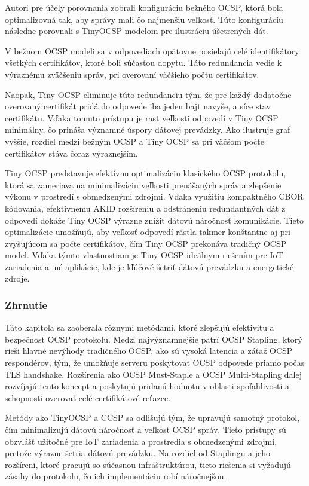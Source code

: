 \documentclass[12pt, twoside]{book}
\begin{document}
Autori pre účely porovnania zobrali konfiguráciu bežného OCSP, ktorá bola optimalizovná tak, aby správy mali čo najmenšiu veľkosť. Túto konfiguráciu následne porovnali s TinyOCSP modelom pre ilustráciu úšetrených dát.

V bežnom OCSP modeli sa v odpovediach opätovne posielajú celé identifikátory všetkých certifikátov, ktoré boli súčasťou dopytu. Táto redundancia vedie k výraznému zväčšeniu správ, pri overovaní väčšieho počtu certifikátov.

Naopak, Tiny OCSP eliminuje túto redundanciu tým, že pre každý dodatočne overovaný certifikát pridá do odpovede iba jeden bajt navyše, a síce stav certifikátu. Vďaka tomuto prístupu je rast veľkosti odpovedí v Tiny OCSP minimálny, čo prináša významné úspory dátovej prevádzky. Ako ilustruje graf vyššie, rozdiel medzi bežným OCSP a Tiny OCSP sa pri väčšom počte certifikátov stáva čoraz výraznejším. 

Tiny OCSP predstavuje efektívnu optimalizáciu klasického OCSP protokolu, ktorá sa zameriava na minimalizáciu veľkosti prenášaných správ a zlepšenie výkonu v prostredí s obmedzenými zdrojmi. Vďaka využitiu kompaktného CBOR kódovania, efektívnemu AKID rozšíreniu a odstráneniu redundantných dát z odpovedí dokáže Tiny OCSP výrazne znížiť dátovú náročnosť komunikácie. Tieto optimalizácie umožňujú, aby veľkosť odpovedí rástla takmer konštantne aj pri zvyšujúcom sa počte certifikátov, čím Tiny OCSP prekonáva tradičný OCSP model. Vďaka týmto vlastnostiam je Tiny OCSP ideálnym riešením pre IoT zariadenia a iné aplikácie, kde je kľúčové šetriť dátovú prevádzku a energetické zdroje.


\subsubsection{Zhrnutie}
Táto kapitola sa zaoberala rôznymi metódami, ktoré zlepšujú efektivitu a bezpečnosť OCSP protokolu. Medzi najvýznamnejšie patrí OCSP Stapling, ktorý rieši hlavné nevýhody tradičného OCSP, ako sú vysoká latencia a záťaž OCSP respondérov, tým, že umožňuje serveru poskytovať OCSP odpovede priamo počas TLS handshake. Rozšírenia ako OCSP Must-Staple a OCSP Multi-Stapling ďalej rozvíjajú tento koncept a poskytujú pridanú hodnotu v oblasti spoľahlivosti a schopnosti overovať celé certifikátové reťazce.

Metódy ako TinyOCSP a CCSP sa odlišujú tým, že upravujú samotný protokol, čím minimalizujú dátovú náročnosť a veľkosť OCSP správ. Tieto prístupy sú obzvlášť užitočné pre IoT zariadenia a prostredia s obmedzenými zdrojmi, pretože výrazne šetria dátovú prevádzku. Na rozdiel od Staplingu a jeho rozšírení, ktoré pracujú so súčasnou infraštruktúrou, tieto riešenia si vyžadujú zásahy do protokolu, čo ich implementáciu robí náročnejšou.
\end{document}
